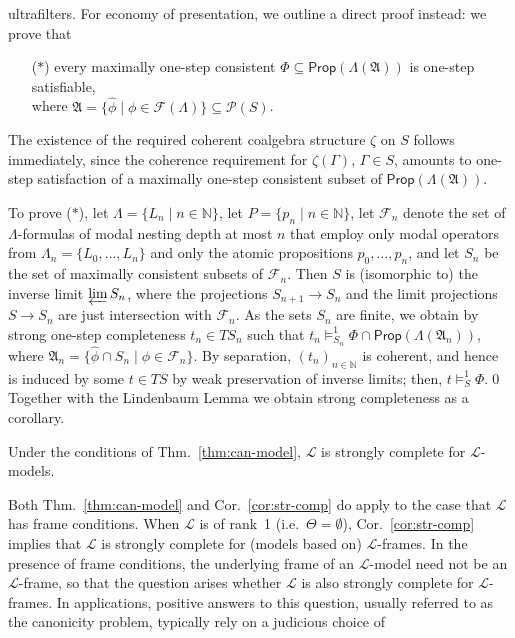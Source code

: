 \documentclass[proceedings]{stacs}
\theoremstyle{definition}
\theoremstyle{plain}
\newcommand{\Pow}{\mathcal{P}}
\newcommand{\Lang}{\mathcal{L}}
\newcommand{\FLang}{\mathcal{F}}
\newcommand{\Nat}{{\mathbb{N}}}
\newcommand{\Prop}{\mathsf{Prop}}
\newcommand{\invlim}{\varprojlim}
\newcommand{\modelsOS}{\models^1}
\newcommand{\FA}{\mathfrak{A}}
\newcommand{\AtProp}{P}
\begin{document}
  ultrafilters. For economy of presentation, we outline a direct
  proof instead: we prove that
  \begin{itemize}
  \item[($*$)] every maximally one-step consistent
    $\Phi\subseteq\Prop(\Lambda(\FA))$ is one-step satisfiable,\\ where
    $\FA=\{\hat\phi\mid\phi\in\FLang(\Lambda)\}\subseteq\Pow(S)$.
  \end{itemize}
  The existence of the required coherent coalgebra structure $\zeta$
  on $S$ follows immediately, since the coherence requirement for
  $\zeta(\Gamma)$, $\Gamma\in S$, amounts to one-step satisfaction of
  a maximally one-step consistent subset of $\Prop(\Lambda(\FA))$. 

  To prove ($*$), let $\Lambda=\{L_n\mid n\in\Nat\}$, let
  $\AtProp=\{p_n\mid n\in\Nat\}$, let $\FLang_n$ denote the set of
  $\Lambda$-formulas of modal nesting depth at most $n$ that employ
  only modal operators from $\Lambda_n=\{L_0,\dots,L_n\}$ and only the
  atomic propositions $p_0,\dots,p_n$, and let $S_n$ be the set of
  maximally consistent subsets of $\FLang_n$. Then $S$ is (isomorphic
  to) the inverse limit $\invlim S_n$, where the projections
  $S_{n+1}\to S_n$ and the limit projections $S\to S_n$ are just
  intersection with $\FLang_n$. As the sets $S_n$ are finite, we
  obtain by strong one-step completeness $t_n\in TS_n$ such that
  $t_n\modelsOS_{S_n} \Phi\cap\Prop(\Lambda(\FA_n))$, where
  $\FA_n=\{\hat\phi\cap S_n\mid\phi\in\FLang_n\}$. By separation,
  $(t_n)_{n\in\Nat}$ is coherent, and hence is induced by some $t\in
  TS$ by weak preservation of inverse limits; then,
  $t\modelsOS_S\Phi$.\qed
\noindent
Together with the Lindenbaum Lemma we obtain strong completeness as
a corollary.
\begin{cor} \label{cor:str-comp}
Under the conditions of Thm.~\ref{thm:can-model},
$\Lang$
is strongly complete for $\Lang$-models.
\end{cor}
\noindent Both Thm.~\ref{thm:can-model} and
Cor.~\ref{cor:str-comp} do apply to the case that $\Lang$ has
frame conditions. When $\Lang$ is of rank~1 (i.e.\
$\Theta=\emptyset$), Cor.~\ref{cor:str-comp} implies that $\Lang$
is strongly complete for (models based on) $\Lang$-frames.  In the
presence of frame conditions, the underlying frame of an $\Lang$-model
need not be an $\Lang$-frame, so that the question arises whether
$\Lang$ is also strongly complete for $\Lang$-frames. In applications,
positive answers to this question, usually referred to as the
canonicity problem, typically rely on a judicious choice of
\end{document}
